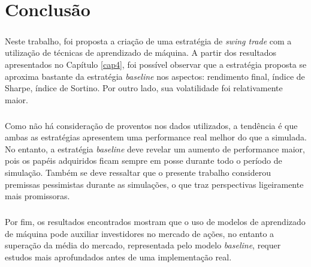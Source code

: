\chapter{Conclusão}
\label{cap5}



\paragraph{} Neste trabalho, foi proposta a criação de uma estratégia de \textit{swing trade} com a utilização de técnicas de aprendizado de máquina. A partir dos resultados apresentados no Capítulo \ref{cap4}, foi possível observar que a estratégia proposta se aproxima bastante da estratégia \textit{baseline} nos aspectos: rendimento final, índice de Sharpe, índice de Sortino. Por outro lado, sua volatilidade foi relativamente maior.

\paragraph{} Como não há consideração de proventos nos dados utilizados, a tendência é que ambas as estratégias apresentem uma performance real melhor do que a simulada. No entanto, a estratégia \textit{baseline} deve revelar um aumento de performance maior, pois os papéis adquiridos ficam sempre em posse durante todo o período de simulação. Também se deve ressaltar que o presente trabalho considerou premissas pessimistas durante as simulações, o que traz perspectivas ligeiramente mais promissoras.

\paragraph{} Por fim, os resultados encontrados mostram que o uso de modelos de aprendizado de máquina pode auxiliar investidores no mercado de ações, no entanto a superação da média do mercado, representada pelo modelo \textit{baseline}, requer estudos mais aprofundados antes de uma implementação real.

